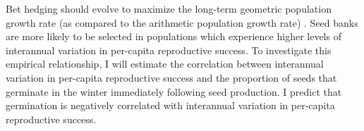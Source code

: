 \documentclass[12pt, oneside, titlepage]{article}   	%
\begin{document}
Bet hedging should evolve to maximize the long-term geometric population growth rate (as compared to the arithmetic population growth rate) \cite{cohen1966,cohen1968,ellner1985,ellner1985a}. Seed banks are more likely to be selected in populations which experience higher levels of interannual variation in per-capita reproductive success. To investigate this empirical relationship, I will estimate the correlation between interannual variation in per-capita reproductive success and the proportion of seeds that germinate in the winter immediately following seed production. I predict that germination is negatively correlated with interannual variation in per-capita reproductive success. %




\end{document}
